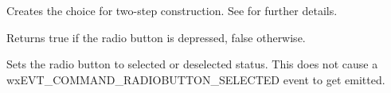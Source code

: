 Creates the choice for two-step construction. See  for
further details.

\label{wxradiobuttongetvalue}


Returns true if the radio button is depressed, false otherwise.

\label{wxradiobuttonsetvalue}


Sets the radio button to selected or deselected status. This does not cause a
wxEVT\_COMMAND\_RADIOBUTTON\_SELECTED event to get emitted.




